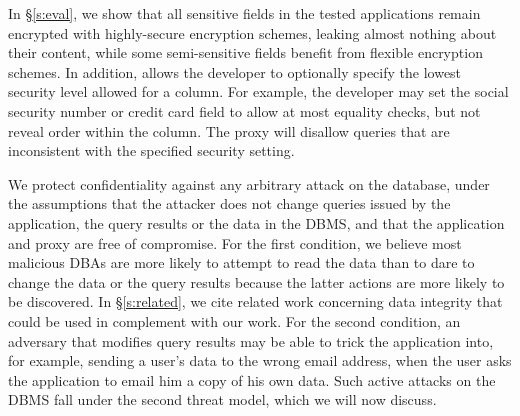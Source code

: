 
In \S\ref{s:eval}, we show that all sensitive fields in the tested
applications remain encrypted with highly-secure encryption schemes, 
leaking almost nothing about their content, while some 
semi-sensitive fields benefit from flexible encryption schemes.
  In addition, \name{}
allows the developer to optionally specify the lowest security level
allowed for a column.  For example, the developer may set the social
security number or credit card field to allow at most equality checks,
but not reveal order within the column.  The proxy will disallow
queries that are inconsistent with the specified security setting.



We protect confidentiality against any arbitrary attack on the
database, under the assumptions that the attacker does not change
queries issued by the application, the query results or the data in
the DBMS, and that the application and proxy are free of compromise.
For the first condition, we believe most malicious DBAs are more
likely to attempt to read the data than to dare to change the data or
the query results because the latter actions are more likely to be
discovered. In \S\ref{s:related}, we cite related work concerning data
integrity that could be used in complement with our work.  For the
second condition, an adversary that modifies query results may be able
to trick the application into, for example, sending a user's data to
the wrong email address, when the user asks the application to email
him a copy of his own data.  Such active attacks on the DBMS fall
under the second threat model, which we will now discuss.

